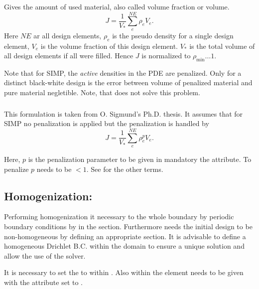 \subsubsection{}
Gives the amount of used material, also called volume fraction or volume.
\begin{equation}
  J = \frac{1}{V_*}\sum_e^{NE} \rho_e V_e.
\end{equation}
Here $NE$ ar all design elements, $\rho_e$ is the pseudo density for a single
design element, $V_e$ is the volume fraction of this design element. $V_*$
is the total volume of all design elements if all were filled. Hence $J$ is normalized 
to $\rho_{\min} \ldots 1$.

Note that for SIMP, the \textit{active} densities in the PDE are penalized. Only for a
distinct black-white design is the error between volume of penalized material and pure material negletible.
Note, that  does not solve this problem.

\subsubsection{}
This formulation is taken from O. Sigmund's Ph.D. thesis. It assumes that for SIMP no
penalization is applied but the penalization is handled by 
\begin{equation}
  J = \frac{1}{V_*}\sum_e^{NE} \rho_e^p V_e.
\end{equation}

Here, $p$ is the penalization parameter to be given in mandatory the  attribute. To penalize $p$ needs
to be $< 1$. See  for the other terms.

\subsection{Homogenization: }
Performing homogenization it necessary to the whole boundary by periodic boundary conditions by  in the  section. Furthermore needs the initial design to be non-homogeneous by defining an appropriate  section. It is advisable to define a homogeneous Drichlet B.C. within the domain to ensure a unique
solution and allow the use of the  solver.

It is necessary to set the  to  within . Also within 
the element  needs to be given with the attribute  set to .

